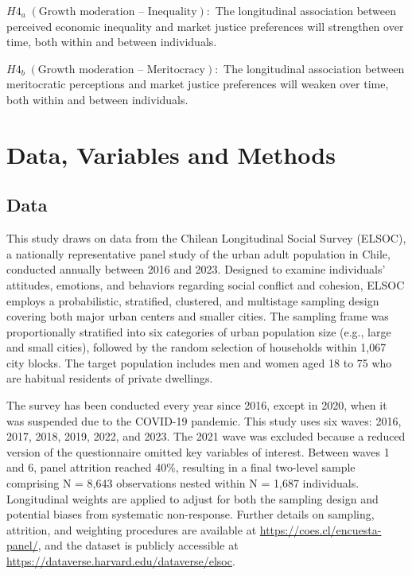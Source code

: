 \documentclass[
  12pt,
]{article}
\begin{document}
\(H4_{a} \; (\text{Growth moderation – Inequality}):\) The longitudinal
association between perceived economic inequality and market justice
preferences will strengthen over time, both within and between
individuals.

\(H4_{b} \; (\text{Growth moderation – Meritocracy}):\) The longitudinal
association between meritocratic perceptions and market justice
preferences will weaken over time, both within and between individuals.

\section{Data, Variables and Methods}\label{data-variables-and-methods}

\subsection{Data}\label{data}

This study draws on data from the Chilean Longitudinal Social Survey
(ELSOC), a nationally representative panel study of the urban adult
population in Chile, conducted annually between 2016 and 2023. Designed
to examine individuals' attitudes, emotions, and behaviors regarding
social conflict and cohesion, ELSOC employs a probabilistic, stratified,
clustered, and multistage sampling design covering both major urban
centers and smaller cities. The sampling frame was proportionally
stratified into six categories of urban population size (e.g., large and
small cities), followed by the random selection of households within
1,067 city blocks. The target population includes men and women aged 18
to 75 who are habitual residents of private dwellings.

The survey has been conducted every year since 2016, except in 2020,
when it was suspended due to the COVID-19 pandemic. This study uses six
waves: 2016, 2017, 2018, 2019, 2022, and 2023. The 2021 wave was
excluded because a reduced version of the questionnaire omitted key
variables of interest. Between waves 1 and 6, panel attrition reached
40\%, resulting in a final two-level sample comprising N = 8,643
observations nested within N = 1,687 individuals. Longitudinal weights
are applied to adjust for both the sampling design and potential biases
from systematic non-response. Further details on sampling, attrition,
and weighting procedures are available at
\url{https://coes.cl/encuesta-panel/}, and the dataset is publicly
accessible at \url{https://dataverse.harvard.edu/dataverse/elsoc}.
\end{document}
